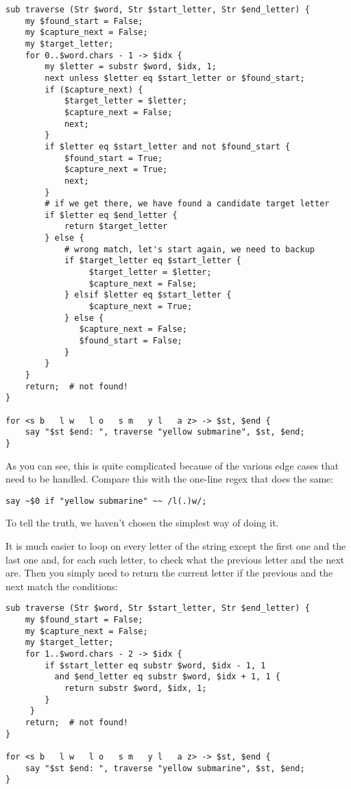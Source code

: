\begin{verbatim}
sub traverse (Str $word, Str $start_letter, Str $end_letter) {
    my $found_start = False;
    my $capture_next = False;
    my $target_letter;
    for 0..$word.chars - 1 -> $idx {
        my $letter = substr $word, $idx, 1;
        next unless $letter eq $start_letter or $found_start;
        if ($capture_next) {
            $target_letter = $letter;
            $capture_next = False;
            next;
        }
        if $letter eq $start_letter and not $found_start {
            $found_start = True;
            $capture_next = True;
            next;
        }
        # if we get there, we have found a candidate target letter
        if $letter eq $end_letter {
            return $target_letter
        } else {
            # wrong match, let's start again, we need to backup
            if $target_letter eq $start_letter {
                 $target_letter = $letter;
                 $capture_next = False;
            } elsif $letter eq $start_letter {
                 $capture_next = True;
            } else {
               $capture_next = False;
               $found_start = False;
            } 
        } 
    }
    return;  # not found!
}          

for <s b   l w   l o   s m   y l   a z> -> $st, $end {
    say "$st $end: ", traverse "yellow submarine", $st, $end;  
}
\end{verbatim}

As you can see, this is quite complicated because of 
the various edge cases that need to be handled. Compare this with 
the one-line regex that does the same:

\begin{verbatim}
say ~$0 if "yellow submarine" ~~ /l(.)w/;
\end{verbatim}

To tell the truth, we haven't chosen the simplest way of 
doing it.

It is much easier to loop on every letter of the string 
except the first one and the last one and, for each such 
letter, to check what the previous letter and the next 
are. Then you simply need to return the current letter if 
the previous and the next match the conditions:

\begin{verbatim}
sub traverse (Str $word, Str $start_letter, Str $end_letter) {
    my $found_start = False;
    my $capture_next = False;
    my $target_letter;
    for 1..$word.chars - 2 -> $idx {
        if $start_letter eq substr $word, $idx - 1, 1
          and $end_letter eq substr $word, $idx + 1, 1 {
            return substr $word, $idx, 1;
        }
     }
    return;  # not found!
}          

for <s b   l w   l o   s m   y l   a z> -> $st, $end {
    say "$st $end: ", traverse "yellow submarine", $st, $end;  
}
\end{verbatim}

